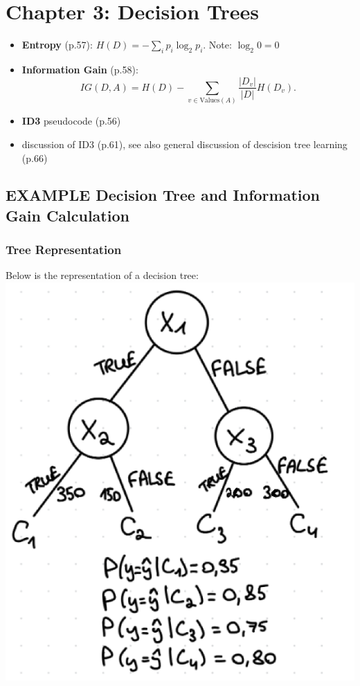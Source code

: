 \documentclass[10pt,a4paper]{article}
\begin{document}
\section*{Chapter 3: Decision Trees}
\begin{itemize}
    \item \textbf{Entropy} (p.57): \( H(D) = - \sum_{i} p_i \log_2 p_i \).
    \newline
    Note: $\log_2 0 = 0$
    \item \textbf{Information Gain} (p.58):
    \[
    IG(D, A) = H(D) - \sum_{v \in \text{Values}(A)} \frac{|D_v|}{|D|} H(D_v).
    \]
    \item \textbf{ID3} pseudocode (p.56) 
    \item discussion of ID3 (p.61), see also general discussion of descision tree learning (p.66)
    
\end{itemize}


\subsection*{EXAMPLE Decision Tree and Information Gain Calculation}

\subsubsection*{Tree Representation}
Below is the representation of a decision tree:
\includegraphics{Screenshot 2025-01-09 at 11.52.49.png}
\end{document}
